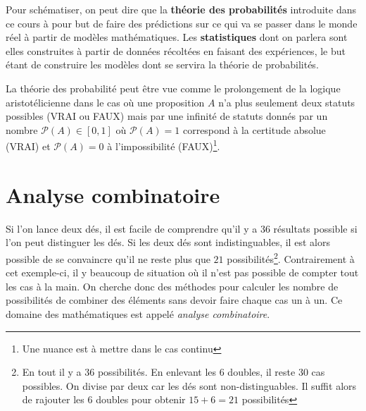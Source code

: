 \documentclass[a4paper,12pt]{report}
\theoremstyle{definition}
\renewcommand{\(}{\left(}
\renewcommand{\)}{\right)}
\renewcommand{\b}{\textbf}
\renewcommand{\P}{\mathcal{P}}
\renewcommand{\d}{\textit}
\begin{document}
    Pour schématiser, on peut dire que la \b{théorie des probabilités} introduite dans ce cours à pour but de faire des prédictions sur ce qui va se passer dans le monde réel à partir de modèles mathématiques. Les \b{statistiques} dont on parlera sont elles construites à partir de données récoltées en faisant des expériences, le but étant de construire les modèles dont se servira la théorie de probabilités.

    \begin{figure}[H]
        \centering
    \end{figure}
    
    La théorie des probabilité peut être vue comme le prolongement de la logique aristotélicienne dans le cas où une proposition $A$ n'a plus seulement deux statuts possibles (VRAI ou FAUX) mais par une infinité de statuts donnés par un nombre $\P(A) \in [0,1]$ où $\P(A) = 1$ correspond à la certitude absolue (VRAI) et $\P(A) = 0$ à l'impossibilité (FAUX)\footnote{Une nuance est à mettre dans le cas continu}.

    \vfill

\pagebreak
\chapter{Analyse combinatoire}
    
    Si l'on lance deux dés, il est facile de comprendre qu'il y a $36$ résultats possible si l'on peut distinguer les dés. Si les deux dés sont indistinguables, il est alors possible de se convaincre qu'il ne reste plus que $21$ possibilités\footnote{En tout il y a 36 possibilités. En enlevant les 6 doubles, il reste 30 cas possibles. On divise par deux car les dés sont non-distinguables. Il suffit alors de rajouter les 6 doubles pour obtenir $15+6=21$ possibilités}. Contrairement à cet exemple-ci, il y beaucoup de situation où il n'est pas possible de compter tout les cas à la main. On cherche donc des méthodes pour calculer les nombre de possibilités de combiner des éléments sans devoir faire chaque cas un à un. Ce domaine des mathématiques est appelé \d{analyse combinatoire}.
\end{document}
